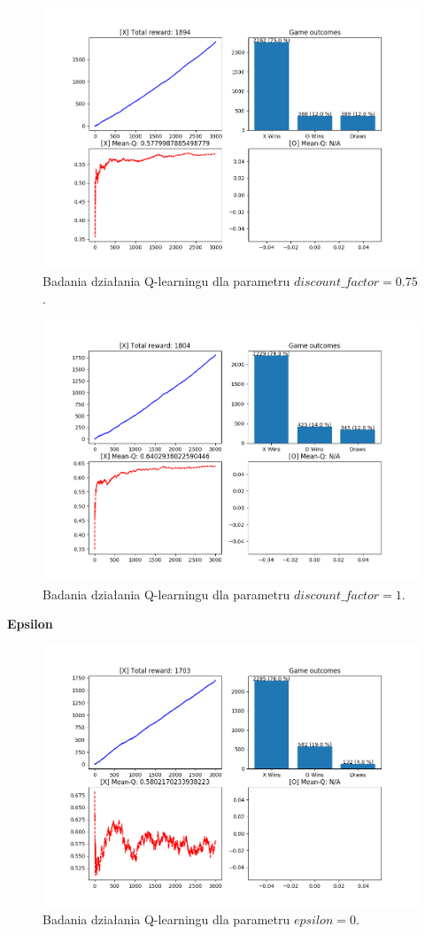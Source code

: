 \begin{figure}[H]
	\centering
	\includegraphics[width=0.7\linewidth]{imgs/q_learning/analysis/batch/df/df_075}
	\caption{Badania działania Q-learningu dla parametru $discount\_factor = 0.75$.}
\end{figure}

\begin{figure}[H]
	\centering
	\includegraphics[width=0.7\linewidth]{imgs/q_learning/analysis/batch/df/df_1}
	\caption{Badania działania Q-learningu dla parametru $discount\_factor = 1$.}
\end{figure}

\pagebreak

\textbf{Epsilon}
\begin{figure}[H]
	\centering
	\includegraphics[width=0.7\linewidth]{imgs/q_learning/analysis/batch/eps/eps_0}
	\caption{Badania działania Q-learningu dla parametru $epsilon = 0$.}
\end{figure}

